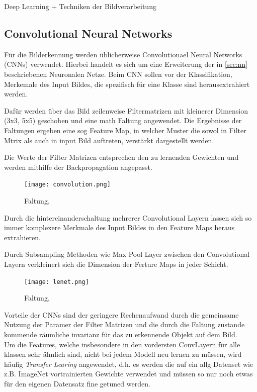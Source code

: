 Deep Learning + Techniken der Bildverarbeitung

\subsection{Convolutional Neural Networks}\label{subsec:cnn}

Für die Bilderkennung werden üblicherweise Convolutionael 
Neural Networks (CNNs) verwendet. Hierbei handelt es sich um eine Erweiterung
der in \ref{sec:nn} beschriebenen Neuronalen Netze. Beim CNN 
sollen vor der Klassifikation, Merkemale des Input Bildes,
die spezifisch für eine Klasse sind herausextrahiert werden.

Dafür werden über das Bild zeilenweise Filtermatrizen mit kleinerer Dimension
(3x3, 5x5) geschoben und eine math Faltung angewendet.
Die Ergebnisse der Faltungen ergeben eine sog Feature Map, in welcher 
Muster die sowol in Filter Mtrix als auch in input Bild auftreten, verstärkt 
dargestellt werden.

Die Werte der Filter Matrizen entsprechen den zu lernenden Gewichten 
und werden mithilfe der Backpropagation angepasst.

\begin{figure}[htb]
    \centering
    \label{fig:conv}
    \texttt{[image: convolution.png]}
    \caption{Faltung, \cite{researcherSimpleIntroductionConvolutional2019}}
\end{figure}



Durch die hintereinanderschaltung mehrerer Convolutional Layern 
lassen sich so immer komplexere Merkmale des Input Bildes in den 
Feature Maps heraus extrahieren.

Durch Subsampling Methoden wie Max Pool Layer zwischen den Convolutional
Layern verkleinert sich die Dimension der Ferture Maps in jeder Schicht.


\begin{figure}[htb]
    \centering
    \label{fig:lenet}
    \texttt{[image: lenet.png]}
    \caption{Faltung, \cite{lecunGradientBasedLearningApplied1998}}
\end{figure}


Vorteile der CNNs sind der geringere Rechenaufwand durch die gemeinsame 
Nutzung der Paramer der Filter Matrizen und die durch die 
Faltung zustande kommende räumliche invarianz für das zu erkennende 
Objekt auf dem Bild.
\\
Um die Features, welche insbesondere in den vordersten ConvLayern für 
alle klassen sehr ähnlich sind, nicht bei jedem Modell
neu lernen zu müssen, wird häufig \textit{Transfer Learing} angewendet, 
d.h. es werden die auf ein allg Datenset wie z.B. ImageNet vortrainierten
Gewichte verwendet und müssen so nur noch etwas für den eigenen Datensatz 
fine getuned werden.


